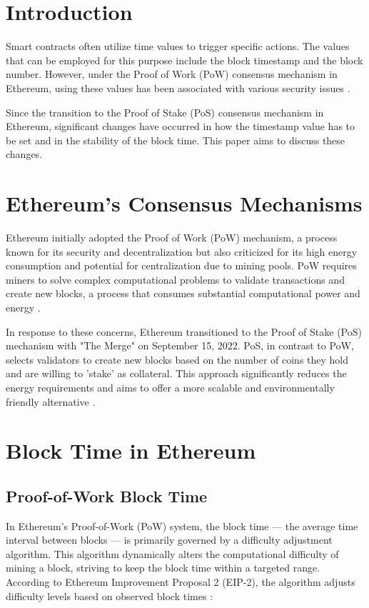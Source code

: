 \section{Introduction}

Smart contracts often utilize time values to trigger specific actions. The
values that can be employed for this purpose include the block timestamp and
the block number. However, under the Proof of Work (PoW) consensus mechanism in
Ethereum, using these values has been associated with various security issues
\cite{swc116} \cite{Conkas2021} \cite{DASP2018} \cite{Osiris2018}
\cite{Oyente2016}.


Since the transition to the Proof of Stake (PoS) consensus mechanism in
Ethereum, significant changes have occurred in how the timestamp value has to
be set and in the stability of the block time. This paper aims to discuss these
changes.

\section{Ethereum's Consensus Mechanisms}
Ethereum initially adopted the Proof of Work (PoW) mechanism, a process known
for its security and decentralization but also criticized for its high energy
consumption and potential for centralization due to mining pools. PoW requires
miners to solve complex computational problems to validate transactions and
create new blocks, a process that consumes substantial computational power and
energy \cite{eth_pow}.

In response to these concerns, Ethereum transitioned to the Proof of Stake
(PoS) mechanism with "The Merge" on September 15, 2022. PoS, in contrast to
PoW, selects validators to create new blocks based on the number of coins they
hold and are willing to 'stake' as collateral. This approach significantly
reduces the energy requirements and aims to offer a more scalable and
environmentally friendly alternative \cite{eth_merge}.


\section{Block Time in Ethereum}

\subsection{Proof-of-Work Block Time}
\label{diff_adjustment}

In Ethereum's Proof-of-Work (PoW) system, the block time — the average time
interval between blocks — is primarily governed by a difficulty adjustment
algorithm. This algorithm dynamically alters the computational difficulty of
mining a block, striving to keep the block time within a targeted range.
According to Ethereum Improvement Proposal 2 (EIP-2), the algorithm adjusts
difficulty levels based on observed block times \cite{eip-2}:

